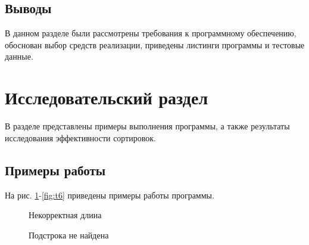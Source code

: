 \documentclass[a4paper,12pt]{article}
\begin{document}
\subsection*{Выводы}

В данном разделе были рассмотрены требования к 
программному обеспечению, обоснован выбор средств 
реализации, приведены листинги программы и тестовые 
данные.

\newpage

\section{Исследовательский раздел}

В разделе представлены примеры выполнения программы,
а также результаты исследования эффективности сортировок.

\subsection{Примеры работы}

На рис. \ref{fig:t0}-\ref{fig:t6} приведены примеры работы программы. 

\begin{figure}[h!]
	\caption{
		Некорректная длина}
	\label{fig:t0}
\end{figure}

\begin{figure}[h!]
	\caption{
		Подстрока не найдена}
	\label{fig:t1}
\end{figure}
\end{document}
